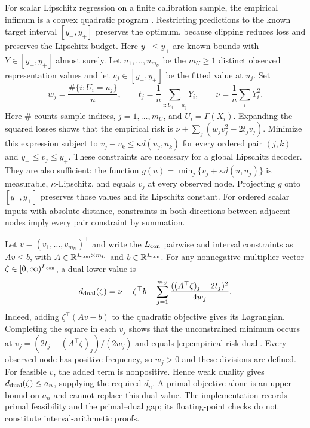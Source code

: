For scalar Lipschitz regression on a finite calibration sample, the empirical
infimum is a convex quadratic program
\citep[Section~III-A]{gottlieb2017regression}. Restricting predictions to the known
target interval $[y_-,y_+]$ preserves the optimum, because clipping
reduces loss and preserves the Lipschitz budget. Here $y_-\leq y_+$ are
known bounds with $Y\in[y_-,y_+]$ almost surely. Let
$u_1,\ldots,u_{m_U}$ be the $m_U\geq1$ distinct observed representation
values and let $v_j\in[y_-,y_+]$ be the fitted value at $u_j$. Set
\[
 w_j=\frac{\#\{i:U_i=u_j\}}n,\qquad
 t_j=\frac1n\sum_{i:U_i=u_j}Y_i,\qquad
 \nu=\frac1n\sum_iY_i^2.
\]
Here $\#$ counts sample indices, $j=1,\ldots,m_U$, and $U_i=\Gamma(X_i)$.
Expanding the squared losses shows that the empirical risk is
$\nu+\sum_j(w_jv_j^2-2t_jv_j)$. Minimize this expression subject to
$v_j-v_k\leq\kappa d(u_j,u_k)$ for every ordered pair $(j,k)$ and
$y_-\leq v_j\leq y_+$. These constraints are necessary for a global
Lipschitz decoder. They are also sufficient: the function
$g(u)=\min_j\{v_j+\kappa d(u,u_j)\}$ is measurable,
$\kappa$-Lipschitz, and equals $v_j$ at every observed node.
Projecting $g$ onto $[y_-,y_+]$ preserves those values and its Lipschitz
constant. For ordered scalar inputs with absolute distance, constraints
in both directions between adjacent nodes imply every pair constraint by
summation.

Let $v=(v_1,\ldots,v_{m_U})^\top$ and write the $L_{\rm con}$ pairwise
and interval constraints as $Av\leq b$, with
$A\in\mathbb R^{L_{\rm con}\times m_U}$ and $b\in\mathbb R^{L_{\rm con}}$.
For any nonnegative multiplier vector
$\zeta\in[0,\infty)^{L_{\rm con}}$, a dual lower value is
\begin{equation}
 d_{\rm dual}(\zeta)=\nu-\zeta^\top b-
 \sum_{j=1}^{m_U}\frac{((A^\top\zeta)_j-2t_j)^2}{4w_j}.
 \label{eq:empirical-risk-dual}
\end{equation}
Indeed, adding $\zeta^\top(Av-b)$ to the quadratic objective gives its
Lagrangian. Completing the square in each $v_j$ shows that the
unconstrained minimum occurs at
$v_j=(2t_j-(A^\top\zeta)_j)/(2w_j)$ and equals
\eqref{eq:empirical-risk-dual}. Every observed node has positive frequency,
so $w_j>0$ and these divisions are defined. For feasible $v$, the added
term is nonpositive. Hence weak duality gives
$d_{\rm dual}(\zeta)\leq a_n$, supplying the required $d_n$.
A primal objective alone is an upper bound on $a_n$ and cannot replace this
dual value. The implementation records primal feasibility and the primal--dual
gap; its floating-point checks do not constitute interval-arithmetic proofs.
